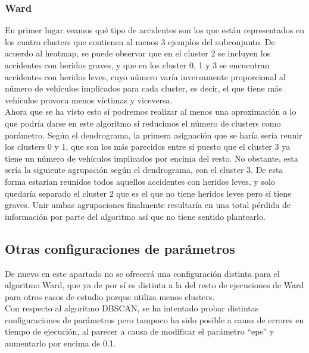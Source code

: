 	\subsubsection{Ward}
	
	En primer lugar veamos qué tipo de accidentes son los que están representados en los cuatro clusters que contienen al menos 3 ejemplos del subconjunto. De acuerdo al heatmap, se puede observar que en el cluster 2 se incluyen los accidentes con heridos graves, y que en los cluster 0, 1 y 3 se encuentran accidentes con heridos leves, cuyo número varía inversamente proporcional al número de vehículos implicados para cada cluster, es decir, el que tiene más vehículos provoca menos víctimas y viceversa.\\
	
	Ahora que se ha visto esto sí podremos realizar al menos una aproximación a lo que podría darse en este algoritmo si reducimos el número de clusters como parámetro. Según el dendrograma, la primera asignación que se haría sería reunir los clusters 0 y 1, que son  los más parecidos entre sí puesto que el cluster 3 ya tiene un número de vehículos implicados por encima del resto. No obstante, esta sería la siguiente agrupación según el dendrograma, con el cluster 3. De esta forma estarían reunidos todos aquellos accidentes con heridos leves, y solo quedaría separado el cluster 2 que es el que no tiene heridos leves pero sí tiene graves. Unir ambas agrupaciones finalmente resultaría en una total pérdida de información por parte del algoritmo así que no tiene sentido plantearlo.\\
	
	\subsection{Otras configuraciones de parámetros}
	De nuevo en este apartado no se ofrecerá una configuración distinta para el algoritmo Ward, que ya de por sí es distinta a la del resto de ejecuciones de Ward para otros casos de estudio porque utiliza menos clusters.\\
	
	Con respecto al algoritmo DBSCAN, se ha intentado probar distintas configuraciones de parámetros pero tampoco ha sido posible a causa de errores en tiempo de ejecución, al parecer a causa de modificar el parámetro ``eps'' y aumentarlo por encima de 0.1.
	
